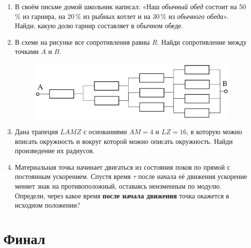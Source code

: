 \documentclass[12pt]{article} %
\begin{document}
\begin{enumerate}
\item В своём письме домой школьник написал: «Наш {\it обычный обед} состоит на 50\,\% из гарнира, 
на 20\,\% из рыбных котлет и на 30\,\% из {\it обычного обеда}». Найди, какую долю гарнир составляет в обычном обеде.

\item
В схеме на рисунке все сопротивления равны $R$. Найди сопротивление между точками $A$ и $B$.
\begin{figure}[h!]
\center
\includegraphics[scale=0.3]{resistors_1234.pdf}
\end{figure}

\item Дана трапеция $LAMZ$ с основаниями $AM = 4$ и $LZ = 16$, 
в которую можно вписать окружность и вокруг которой можно описать окружность. Найди произведение их радиусов.

\item Материальная точка начинает двигаться из состояния покоя по прямой с постоянным ускорением. 
Спустя время $\tau$ после начала её движения ускорение меняет знак на противоположный, оставаясь неизменным по модулю. 
Определи, через какое время {\bf после начала движения} точка окажется в исходном положении?

\end{enumerate}



\section*{Финал}
\end{document}
